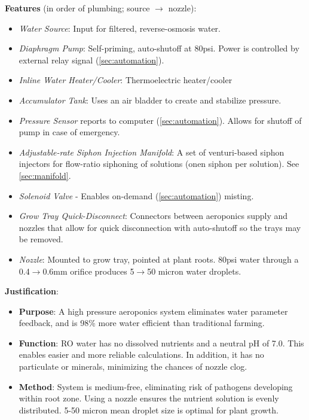 \documentclass{report}
\begin{document}
\textbf{Features} (in order of plumbing; source $\to$ nozzle):
\begin{itemize}
    \item \textit{Water Source}: Input for filtered, reverse-osmosis water.
    \item \textit{Diaphragm Pump}: Self-priming, auto-shutoff at 80psi. Power is controlled by external relay signal (\ref{sec:automation}).
    \item \textit{Inline Water Heater/Cooler}: Thermoelectric heater/cooler
    \item \textit{Accumulator Tank}: Uses an air bladder to create and stabilize pressure.
    \item \textit{Pressure Sensor} reports to computer (\ref{sec:automation}). Allows for shutoff of pump in case of emergency.
    \item \textit{Adjustable-rate Siphon Injection Manifold}: A set of venturi-based siphon injectors for flow-ratio siphoning of solutions (onen siphon per solution). See \ref{sec:manifold}.
    \item \textit{Solenoid Valve} - Enables on-demand (\ref{sec:automation}) misting.
    \item \textit{Grow Tray Quick-Disconnect}: Connectors between aeroponics supply and nozzles that allow for quick disconnection with auto-shutoff so the trays may be removed.
    \item \textit{Nozzle}: Mounted to grow tray, pointed at plant roots. 80psi water through a 0.4$\to$0.6mm orifice produces 5$\to$50 micron water droplets. %
\end{itemize}

\newpage

\textbf{Justification}: 
\begin{itemize}
    \item \textbf{Purpose}: A high pressure aeroponics system eliminates water parameter feedback, and is 98\% more water efficient than traditional farming.
    \item \textbf{Function}: RO water has no dissolved nutrients and a neutral pH of 7.0. This enables easier and more reliable calculations. In addition, it has no particulate or minerals, minimizing the chances of nozzle clog.
    \item \textbf{Method}: System is medium-free, eliminating risk of pathogens developing within root zone. Using a nozzle ensures the nutrient solution is evenly distributed. 5-50 micron mean droplet size is optimal for plant growth. %
\end{itemize}
\end{document}
